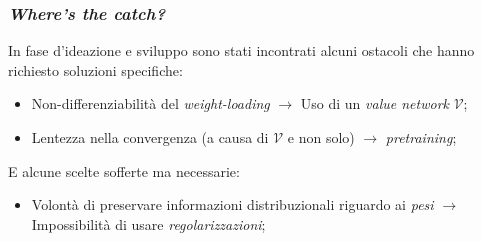 \documentclass{beamer}
\begin{document}
{%

\begin{frame}
	\frametitle{\textit{Where's the catch?}}
	In fase d'ideazione e sviluppo sono stati incontrati alcuni ostacoli che hanno richiesto soluzioni specifiche:
	\hfill\break

	\begin{itemize}
		\item Non-differenziabilità del \textit{weight-loading} $\rightarrow$ Uso di un \textit{value network} $\mathcal{V}$;
		\item Lentezza nella convergenza (a causa di $\mathcal{V}$ e non solo) $\rightarrow$ \textit{pretraining};
	\end{itemize}
	\hfill\break

	E alcune scelte sofferte ma necessarie:
	\hfill\break

	\begin{itemize}
		\item Volontà di preservare informazioni distribuzionali riguardo ai \textit{pesi} $\rightarrow$ Impossibilità di usare \textit{regolarizzazioni};
	\end{itemize}
	\hfill\break


\end{frame}

}



\end{document}
